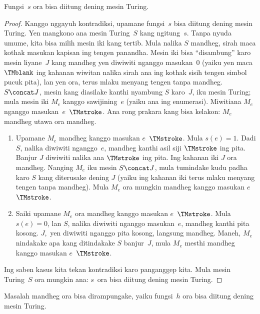 \documentclass[../../../include/open-logic-section]{subfiles}
\begin{document}
\begin{lem}
Fungsi~$s$ ora bisa diitung dening mesin Turing.
\end{lem}

\begin{proof}
Kanggo nggayuh kontradiksi, upamane fungsi~$s$
bisa diitung dening mesin Turing. Yen mangkono
ana mesin Turing~$S$ kang ngitung~$s$.
%
 Tanpa nyuda umume, kita bisa milih mesin
iki kang tertib. Mula nalika $S$ mandheg,
sirah maca kothak masukan kapisan ing tengen panandha. Mesin iki bisa
``disambung'' karo mesin liyane~$J$ kang
mandheg yen diwiwiti nganggo masukan~$0$
(yaiku yen maca $\TMblank$ ing kahanan
wiwitan nalika sirah ana ing kothak sisih
tengen simbol pucuk pita), lan yen ora,
terus mlaku menyang tengen tanpa mandheg.
$S \concat J$, mesin kang diasilake kanthi
nyambung $S$ karo~$J$, iku mesin Turing;
mula mesin iki $M_e$ kanggo sawijining~$e$
(yaiku ana ing enumerasi). Miwitiana $M_e$
nganggo masukan~$e$~$\TMstroke$. Ana rong
prakara kang bisa kelakon: $M_e$ mandheg utawa ora mandheg.
\begin{enumerate}
\item Upamane $M_e$ mandheg kanggo masukan
  $e$~$\TMstroke$. Mula $s(e) = 1$.
  Dadi $S$, nalika diwiwiti nganggo~$e$,
  mandheg kanthi asil siji $\TMstroke$
  ing pita. Banjur $J$ diwiwiti nalika ana
  $\TMstroke$ ing pita. Ing kahanan iki
  $J$ ora mandheg. Nanging $M_e$ iku mesin
  $S \concat J$, mula tumindake kudu padha
  karo $S$ kang diterusake dening $J$
  (yaiku ing kahanan iki terus mlaku
  menyang tengen tanpa mandheg). Mula
  $M_e$ ora mungkin mandheg kanggo masukan
  $e$~$\TMstroke$.

\item Saiki upamane $M_e$ ora mandheg
  kanggo masukan $e$~$\TMstroke$.
  Mula $s(e) = 0$, lan $S$, nalika
  diwiwiti nganggo masukan~$e$, mandheg
  kanthi pita kosong. $J$,~yen diwiwiti
  nganggo pita kosong, langsung mandheg.
  Maneh, $M_e$ nindakake apa kang
  ditindakake $S$ banjur~$J$, mula
  $M_e$ mesthi mandheg kanggo masukan
  $e$~$\TMstroke$.
\end{enumerate}
Ing saben kasus kita tekan kontradiksi karo
panganggep kita. Mula mesin Turing~$S$
ora mungkin ana: $s$~ora bisa diitung
dening mesin Turing.
\end{proof}

\begin{thm}
 Masalah mandheg ora bisa
dirampungake, yaiku fungsi~$h$ ora bisa diitung
dening mesin Turing.
\end{thm}
\end{document}
